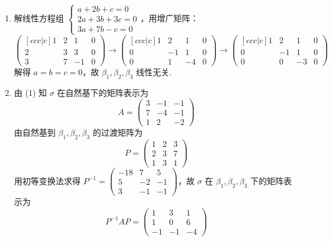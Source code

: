 \begin{enumerate}
\begin{enumerate}
        \item 解线性方程组 \(\begin{cases}
            a+2b+c=0\\
            2a+3b+3c=0\\
            3a+7b-c=0
            \end{cases}\)，用增广矩阵：
            \[
            \begin{pmatrix}[ccc|c]
            1 & 2 & 1 & 0 \\
            2 & 3 & 3 & 0 \\
            3 & 7 & -1 & 0
            \end{pmatrix} \to
            \begin{pmatrix}[ccc|c]
            1 & 2 & 1 & 0 \\
            0 & -1 & 1 & 0 \\
            0 & 1 & -4 & 0
            \end{pmatrix} \to
            \begin{pmatrix}[ccc|c]
            1 & 2 & 1 & 0 \\
            0 & -1 & 1 & 0 \\
            0 & 0 & -3 & 0
            \end{pmatrix}
            \]
            解得 \(a=b=c=0\)，故 \(\beta_1,\beta_2,\beta_3\) 线性无关.
        \item 由 (1) 知 \(\sigma\) 在自然基下的矩阵表示为
        \[
        A=\begin{pmatrix}
            3 & -1 & -1\\
            7 & -4 & -1\\
            1 & 2 & -2
        \end{pmatrix}
        \]
        由自然基到 \(\beta_1,\beta_2,\beta_3\) 的过渡矩阵为
        \[
        P=\begin{pmatrix}
            1 & 2 & 3\\
            2 & 3 & 7\\
            1 & 3 & 1
        \end{pmatrix}
        \]
        用初等变换法求得 \(P^{-1}=\begin{pmatrix}
            -18 & 7 & 5\\
            5 & -2 & -1\\
            3 & -1 & -1
        \end{pmatrix}\)，故 \(\sigma\) 在 \(\beta_1,\beta_2,\beta_3\) 下的矩阵表示为
        \[ P^{-1}AP=\begin{pmatrix}
            1 & 3 & 1\\
            1 & 0 & 6\\
            -1 & -1 & -4
        \end{pmatrix}\]
    \end{enumerate}


\end{enumerate}
